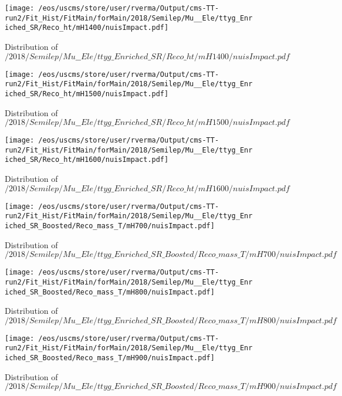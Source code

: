 \begin{figure}
\centering
\texttt{[image: /eos/uscms/store/user/rverma/Output/cms-TT-run2/Fit\_Hist/FitMain/forMain/2018/Semilep/Mu\_\_Ele/ttyg\_Enriched\_SR/Reco\_ht/mH1400/nuisImpact.pdf]}
\caption{Distribution of $/2018/Semilep/Mu\_\_Ele/ttyg\_Enriched\_SR/Reco\_ht/mH1400/nuisImpact.pdf$}
\end{figure}

\begin{figure}
\centering
\texttt{[image: /eos/uscms/store/user/rverma/Output/cms-TT-run2/Fit\_Hist/FitMain/forMain/2018/Semilep/Mu\_\_Ele/ttyg\_Enriched\_SR/Reco\_ht/mH1500/nuisImpact.pdf]}
\caption{Distribution of $/2018/Semilep/Mu\_\_Ele/ttyg\_Enriched\_SR/Reco\_ht/mH1500/nuisImpact.pdf$}
\end{figure}

\begin{figure}
\centering
\texttt{[image: /eos/uscms/store/user/rverma/Output/cms-TT-run2/Fit\_Hist/FitMain/forMain/2018/Semilep/Mu\_\_Ele/ttyg\_Enriched\_SR/Reco\_ht/mH1600/nuisImpact.pdf]}
\caption{Distribution of $/2018/Semilep/Mu\_\_Ele/ttyg\_Enriched\_SR/Reco\_ht/mH1600/nuisImpact.pdf$}
\end{figure}

\begin{figure}
\centering
\texttt{[image: /eos/uscms/store/user/rverma/Output/cms-TT-run2/Fit\_Hist/FitMain/forMain/2018/Semilep/Mu\_\_Ele/ttyg\_Enriched\_SR\_Boosted/Reco\_mass\_T/mH700/nuisImpact.pdf]}
\caption{Distribution of $/2018/Semilep/Mu\_\_Ele/ttyg\_Enriched\_SR\_Boosted/Reco\_mass\_T/mH700/nuisImpact.pdf$}
\end{figure}

\begin{figure}
\centering
\texttt{[image: /eos/uscms/store/user/rverma/Output/cms-TT-run2/Fit\_Hist/FitMain/forMain/2018/Semilep/Mu\_\_Ele/ttyg\_Enriched\_SR\_Boosted/Reco\_mass\_T/mH800/nuisImpact.pdf]}
\caption{Distribution of $/2018/Semilep/Mu\_\_Ele/ttyg\_Enriched\_SR\_Boosted/Reco\_mass\_T/mH800/nuisImpact.pdf$}
\end{figure}

\begin{figure}
\centering
\texttt{[image: /eos/uscms/store/user/rverma/Output/cms-TT-run2/Fit\_Hist/FitMain/forMain/2018/Semilep/Mu\_\_Ele/ttyg\_Enriched\_SR\_Boosted/Reco\_mass\_T/mH900/nuisImpact.pdf]}
\caption{Distribution of $/2018/Semilep/Mu\_\_Ele/ttyg\_Enriched\_SR\_Boosted/Reco\_mass\_T/mH900/nuisImpact.pdf$}
\end{figure}

